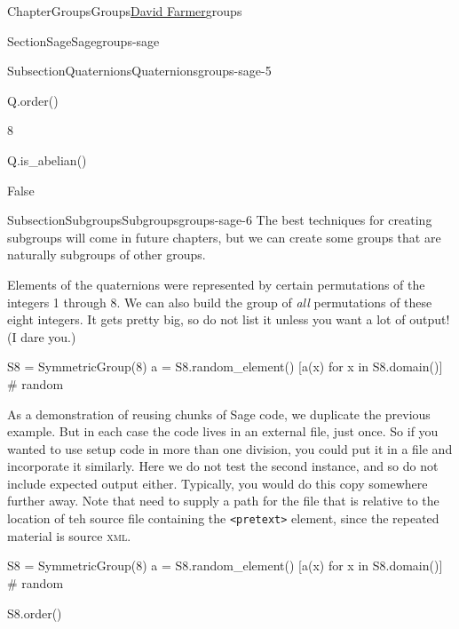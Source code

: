 \documentclass[oneside,10pt,]{book}
\newcommand{\mono}[1]{\texttt{#1}}
\newcommand{\initialism}[1]{\textsc{\MakeLowercase{#1}}}
\numberwithin{equation}{section}
\begin{document}
\begin{chapterptx}{Chapter}{Groups}{}{Groups}{\hyperlink{dfarmer}{David Farmer}}{}{groups}
\begin{sectionptx}{Section}{Sage}{}{Sage}{}{}{groups-sage}
\begin{subsectionptx}{Subsection}{Quaternions}{}{Quaternions}{}{}{groups-sage-5}
\begin{sageinput}
Q.order()
\end{sageinput}
\begin{sageoutput}
8
\end{sageoutput}
\begin{sageinput}
Q.is_abelian()
\end{sageinput}
\begin{sageoutput}
False
\end{sageoutput}
\end{subsectionptx}
%
%
\typeout{************************************************}
\typeout{************************************************}
%
\begin{subsectionptx}{Subsection}{Subgroups}{}{Subgroups}{}{}{groups-sage-6}
The best techniques for creating subgroups will come in future chapters, but we can create some groups that are naturally subgroups of other groups.%
\par
Elements of the quaternions were represented by certain permutations of the integers 1 through 8.  We can also build the group of \emph{all} permutations of these eight integers.  It gets pretty big, so do not list it unless you want a lot of output!  (I dare you.)%
\begin{sageinput}
S8 = SymmetricGroup(8)
a = S8.random_element()
[a(x) for x in S8.domain()]     # random
\end{sageinput}
\begin{sageoutput}
[5, 2, 6, 4, 1, 8, 3, 7]
\end{sageoutput}
As a demonstration of reusing chunks of Sage code, we duplicate the previous example.  But in each case the code lives in an external file, just once.  So if you wanted to use setup code in more than one division, you could put it in a file and incorporate it similarly.  Here we do not test the second instance, and so do not include expected output either.  Typically, you would do this copy somewhere further away.  Note that need to supply a path for the file that is relative to the location of teh source file containing the \mono{<pretext>} element, since the repeated material is source \initialism{XML}.%
\begin{sageinput}
S8 = SymmetricGroup(8)
a = S8.random_element()
[a(x) for x in S8.domain()]     # random
\end{sageinput}
\begin{sageinput}
S8.order()
\end{sageinput}
\begin{sageoutput}

\end{sageoutput}
\end{subsectionptx}
\end{sectionptx}
\end{chapterptx}
\end{document}
